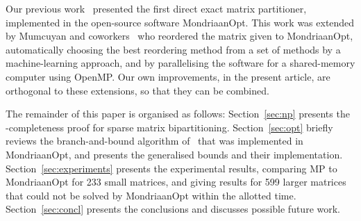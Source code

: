 Our previous work~\cite{pelt15} presented the first direct
exact matrix partitioner, implemented in the open-source software
MondriaanOpt. This work was extended by Mumcuyan
and coworkers~\cite{mumcuyan18} who 
reordered the matrix given to MondriaanOpt,
automatically choosing the best reordering method
from a set of methods by a machine-learning approach,
and by parallelising the software for a shared-memory computer
using OpenMP. 
Our own improvements, in the present article,
are orthogonal to these extensions,
so that they can be combined.  

The remainder of this paper is organised as follows:
Section~\ref{sec:np} presents the \NP-completeness proof 
for sparse matrix bipartitioning.
Section~\ref{sec:opt} briefly reviews the
branch-and-bound algorithm of~\cite{pelt15}
that was implemented in MondriaanOpt, and presents the generalised bounds
and their implementation.
Section~\ref{sec:experiments} presents the experimental results,
comparing MP to MondriaanOpt for 233 small matrices, 
and giving results for 599 larger matrices that could not be solved
by MondriaanOpt within the allotted time.
Section~\ref{sec:concl} presents the conclusions and discusses possible future
work.

